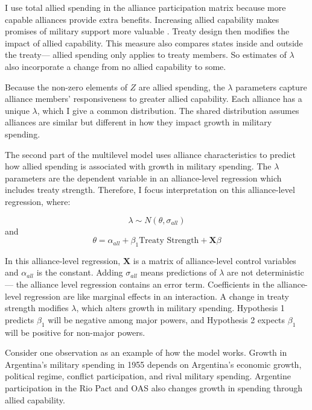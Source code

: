 \documentclass[12pt]{article}
\begin{document}
I use total allied spending in the alliance participation matrix because more capable alliances provide extra benefits.
Increasing allied capability makes promises of military support more valuable \citep{Johnsonetal2015}.  
Treaty design then modifies the impact of allied capability.   
This measure also compares states inside and outside the treaty--- allied spending only applies to treaty members. 
So estimates of $\lambda$ also incorporate a change from no allied capability to some. 

Because the non-zero elements of $Z$ are allied spending, the $\lambda$ parameters capture alliance members' responsiveness to greater allied capability. 
Each alliance has a unique $\lambda$, which I give a common distribution. 
The shared distribution assumes alliances are similar but different in how they impact growth in military spending. 


The second part of the multilevel model uses alliance characteristics to predict how allied spending is associated with growth in military spending. 
The $\lambda$ parameters are the dependent variable in an alliance-level regression which includes treaty strength.
Therefore, I focus interpretation on this alliance-level regression, where: 

\begin{equation}
\lambda \sim N(\theta, \sigma_{all})
\end{equation} 
and 
\begin{equation}
\theta = \alpha_{all} + \beta_1 \mbox{Treaty Strength} + \textbf{X} \beta
\end{equation}

In this alliance-level regression, $\textbf{X}$ is a matrix of alliance-level control variables and $\alpha_{all}$ is the constant.
Adding $\sigma_{all}$ means predictions of $\lambda$ are not deterministic--- the alliance level regression contains an error term. 
Coefficients in the alliance-level regression are like marginal effects in an interaction. 
A change in treaty strength modifies $\lambda$, which alters growth in military spending.
Hypothesis 1 predicts $\beta_1$ will be negative among major powers, and Hypothesis 2 expects $\beta_1$ will be positive for non-major powers.  


Consider one observation as an example of how the model works. 
Growth in Argentina's military spending in 1955 depends on Argentina's economic growth, political regime, conflict participation, and rival military spending. 
Argentine participation in the Rio Pact and OAS also changes growth in spending through allied capability. 
\end{document}
